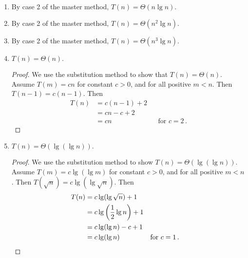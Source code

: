 \documentclass{abrice}
\begin{document}
\begin{enumerate}[label=(\alph*)]
\item By case 2 of the master method, $T(n) = \Theta(n \lg n)$.
\item By case 2 of the master method, $T(n) = \Theta(n^2 \lg n)$.
\item By case 2 of the master method, $T(n) = \Theta(n^3 \lg n)$.
\item $T(n) = \Theta(n)$.
  \begin{proof}
    We use the substitution method to show that $T(n) = \Theta(n)$. Assume
    $T(m) = cn$ for constant $c > 0$, and for all positive $m < n$. Then
    $T(n - 1) = c(n - 1)$. Then
    \begin{align*}
      T(n) &= c(n - 1) + 2 \\
      &= cn - c + 2 \\
      &= cn && \text{for } c = 2 \, .
    \end{align*}
  \end{proof}
\item $T(n) = \Theta(\lg(\lg n))$.
  \begin{proof}
    We use the substitution method to show $T(n) = \Theta(\lg(\lg n))$. Assume
    $T(m) = c \lg(\lg m)$ for constant $c > 0$, and for all positive $m <
    n$. Then $T(\sqrt n) = c \lg(\lg \sqrt n)$. Then
    \begin{align*}
      T(n) &= c \lg(\lg \sqrt n) + 1 \\
      &= c \lg\left( {1 \over 2} \lg n \right) + 1 \\
      &= c \lg(\lg n) - c + 1 \\
      &= c \lg(\lg n) && \text{for } c = 1 \, .
    \end{align*}
  \end{proof}
\end{enumerate}
\end{document}
